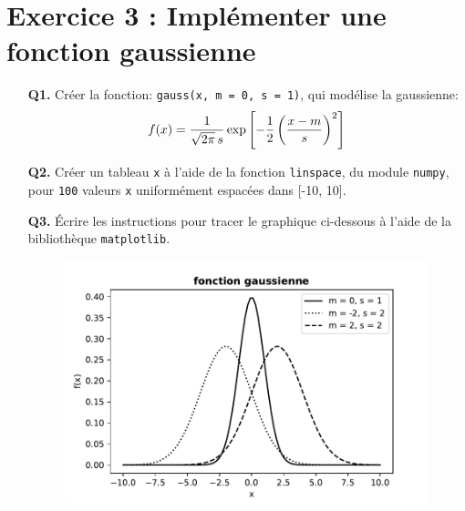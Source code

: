 \documentclass[a4paper,11pt]{article}
\theoremstyle{mytheor}
\begin{document}
\section*{Exercice 3 : Implémenter une fonction gaussienne}
\begin{itemize}
\item[\textbf{Q1.}] Créer la fonction: \texttt{gauss(x, m = 0, s = 1)}, qui modélise la gaussienne:
\begin{equation*}
f(x) =
{1\over\sqrt{2\pi }\, s}
\exp{\left[-\frac{1}{2}\left({x-m\over s}\right)^2\right]}
\end{equation*}


\item[\textbf{Q2.}] Créer un tableau \texttt{x} à l'aide de la fonction \texttt{linspace}, du module \texttt{numpy}, pour \texttt{100} valeurs \texttt{x} uniformément espacées dans [-10, 10].

\item[\textbf{Q3.}] Écrire les instructions pour tracer le graphique ci-dessous à l'aide de la bibliothèque \texttt{matplotlib}.
\begin{figure}[th!]
\centering
\includegraphics[width=0.9\linewidth]{figures/gaussian}
\label{fig:gaussian}
\end{figure}

\end{itemize}
\end{document}
